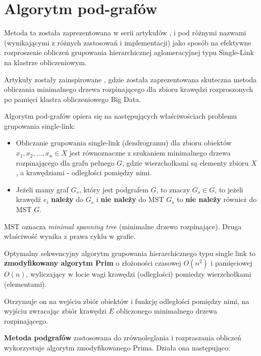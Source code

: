 \documentclass[11pt]{mgr}
\begin{document}
\chapter{Algorytm pod-grafów}\label{metoda-podgrafuxf3w}

Metoda ta została zaprezentowana w serii artykułów \cite{jin2013disc}, \cite{jin2015scalable} i \cite{jin2015incremental} pod różnymi nazwami (wynikającymi z różnych zastosowań i implementacji) jako sposób na efektywne rozproszenie obliczeń grupowania hierarchicznej aglomeracyjnej typu Single-Link na klastrze obliczeniowym.

Artykuły zostały zainspirowane \cite{lattanzi2011filtering}, gdzie została zaprezentowana skuteczna metoda obliczania minimalnego drzewa rozpinającego dla zbioru krawędzi rozproszonych po pamięci klastra obliczeniowego Big Data.

Algorytm pod-grafów opiera się na następujących właściwościach problemu grupowania single-link:

\begin{itemize}
\item
  Obliczanie grupowania single-link (dendrogramu) dla zbioru obiektów
  \(x_{1}, x_{2},...,x_{n} \in X\) jest równoznaczne z szukaniem
  minimalnego drzewa rozpinającego dla grafu pełnego \(G\), gdzie
  wierzchołkami są elementy zbioru \(X\), a krawędziami - odległości
  pomiędzy nimi.
\item
  Jeżeli mamy graf \(G_{s}\), który jest podgrafem \(G\), to znaczy
  \(G_{s} \in G\), to jeżeli krawędź \(e_{i}\) \textbf{należy} do
  \(G_{s}\) i \textbf{nie należy} do MST \(G_{s}\) to \textbf{nie
  należy} również do MST \(G\).
\end{itemize}

MST oznacza \emph{minimal spanning tree} (minimalne drzewo rozpinające).
Druga właściwość wynika z prawa cyklu w grafie.

Optymalny sekwencyjny algorytm  grupowania hierarchicznego typu single
link to \textbf{zmodyfikowany algorytm Prim} o złożoności czasowej \(O(n^2)\) i
pamięciowej \(O(n)\), wyliczający w locie wagi krawędzi (odległości)
pomiedzy wierzchołkami (elementami).

Otrzymuje on na wejściu zbiór obiektów i funkcję odległości pomiędzy
nimi, na wyjściu zwracając zbiór krawędzi \(E\) obliczonego minimalnego
drzewa rozpinającego.

\textbf{Metoda podgrafów} zastosowana do zrównoleglania i rozpraszania
obliczeń wykorzystuje algorytm zmodyfikowanego Prima. Działa ona
następująco:
\end{document}

